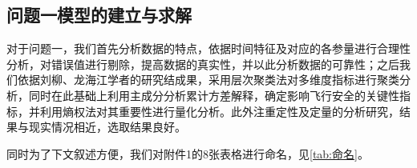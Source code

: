\documentclass{MathorCupModeling}
\begin{document}
	\subsection{问题一模型的建立与求解}
	对于问题一，我们首先分析数据的特点，依据时间特征及对应的各参量进行合理性分析，对错误值进行剔除，提高数据的真实性，并以此分析数据的可靠性；之后我们依据刘柳\textcolor{blue}{\cite{Paper:刘柳}}、龙海江\textcolor{blue}{\cite{Paper:龙海江}}学者的研究结成果，采用层次聚类法对多维度指标进行聚类分析，同时在此基础上利用主成分分析累计方差解释，确定影响飞行安全的关键性指标，并利用熵权法对其重要性进行量化分析。此外注重定性及定量的分析研究，结果与现实情况相近，选取结果良好。

	同时为了下文叙述方便，我们对附件1的8张表格进行命名，见\textcolor{blue}{\cref{tab:命名}}。
\begin{table}[htbp]
	\centering
	\caption{附件1表格命名航班对应}
	\label{tab:命名}
  \end{table}
  
\end{document}
